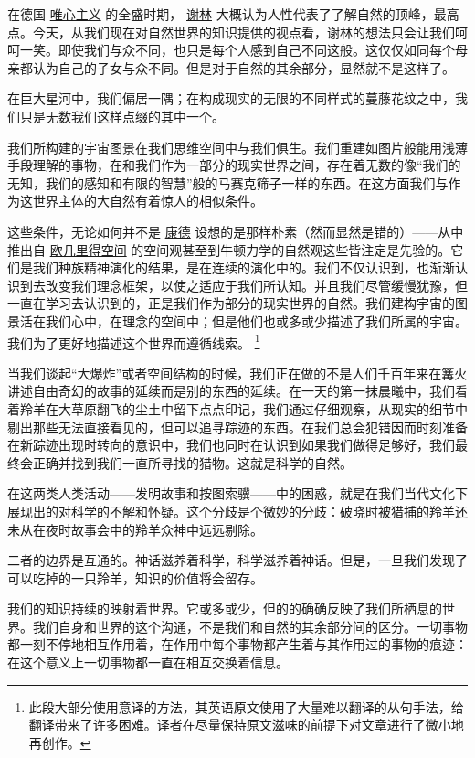     在德国
\href{http://toyhouse.cc/wiki/index.php/唯心主义}{唯心主义}
的全盛时期，
\href{https://en.wikipedia.org/wiki/Friedrich Wilhelm Joseph Schelling}{谢林}
大概认为人性代表了了解自然的顶峰，最高点。今天，从我们现在对自然世界的知识提供的视点看，谢林的想法只会让我们呵呵一笑。即使我们与众不同，也只是每个人感到自己不同这般。这仅仅如同每个母亲都认为自己的子女与众不同。但是对于自然的其余部分，显然就不是这样了。

    在巨大星河中，我们偏居一隅；在构成现实的无限的不同样式的蔓藤花纹之中，我们只是无数我们这样点缀的其中一个。

    我们所构建的宇宙图景在我们思维空间中与我们俱生。我们重建如图片般能用浅薄手段理解的事物，在和我们作为一部分的现实世界之间，存在着无数的像“我们的无知，我们的感知和有限的智慧”般的马赛克筛子一样的东西。在这方面我们与作为这世界主体的大自然有着惊人的相似条件。

    这些条件，无论如何并不是
\href{https://en.wikipedia.org/wiki/Immanuel Kant}{康德}
设想的是那样朴素（然而显然是错的）——从中推出自
\href{http://toyhouse.cc/wiki/index.php/欧几里得空间}{欧几里得空间}
的空间观甚至到牛顿力学的自然观这些皆注定是先验的。它们是我们种族精神演化的结果，是在连续的演化中的。我们不仅认识到，也渐渐认识到去改变我们理念框架，以使之适应于我们所认知。并且我们尽管缓慢犹豫，但一直在学习去认识到的，正是我们作为部分的现实世界的自然。我们建构宇宙的图景活在我们心中，在理念的空间中；但是他们也或多或少描述了我们所属的宇宙。我们为了更好地描述这个世界而遵循线索。
\footnote[2]
{
此段大部分使用意译的方法，其英语原文使用了大量难以翻译的从句手法，给翻译带来了许多困难。译者在尽量保持原文滋味的前提下对文章进行了微小地再创作。
}

    当我们谈起“大爆炸”或者空间结构的时候，我们正在做的不是人们千百年来在篝火讲述自由奇幻的故事的延续而是别的东西的延续。在一天的第一抹晨曦中，我们看着羚羊在大草原翻飞的尘土中留下点点印记，我们通过仔细观察，从现实的细节中剔出那些无法直接看见的，但可以追寻踪迹的东西。在我们总会犯错因而时刻准备在新踪迹出现时转向的意识中，我们也同时在认识到如果我们做得足够好，我们最终会正确并找到我们一直所寻找的猎物。这就是科学的自然。

    在这两类人类活动——发明故事和按图索骥——中的困惑，就是在我们当代文化下展现出的对科学的不解和怀疑。这个分歧是个微妙的分歧：破晓时被猎捕的羚羊还未从在夜时故事会中的羚羊众神中远远剔除。

    二者的边界是互通的。神话滋养着科学，科学滋养着神话。但是，一旦我们发现了可以吃掉的一只羚羊，知识的价值将会留存。

    我们的知识持续的映射着世界。它或多或少，但的的确确反映了我们所栖息的世界。我们自身和世界的这个沟通，不是我们和自然的其余部分间的区分。一切事物都一刻不停地相互作用着，在作用中每个事物都产生着与其作用过的事物的痕迹：在这个意义上一切事物都一直在相互交换着信息。

